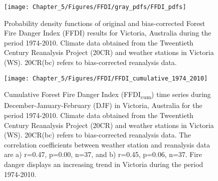 \begin{figure}[H]
\noindent \begin{centering}
\texttt{[image: Chapter\_5/Figures/FFDI/gray\_pdfs/FFDI\_pdfs]}
\par\end{centering}

\caption[Probability density functions of original and bias-corrected Forest
Fire Danger Index (FFDI) results for Victoria, Australia during the
period 1974-2010]{Probability density functions of original and bias-corrected Forest
Fire Danger Index (FFDI) results for Victoria, Australia during the
period 1974-2010. Climate data obtained from the Tweentieth Century
Reanalysis Project (20CR) and weather stations in Victoria (WS). 20CR(bc)
refers to bias-corrected reanalysis data. \label{fig:Probability density functions of orginal and bias-corrected Forest Fire Danger Index results for Victoria, Australia during the period 1974-2010}}
\end{figure}

\begin{figure}[H]
\noindent \begin{centering}
\texttt{[image: Chapter\_5/Figures/FFDI/FFDI\_cumulative\_1974\_2010]}
\par\end{centering}

\caption[Cumulative Forest Fire Danger Index (FFDI\protect\textsubscript{cum})
time series during December-January-February (DJF) in Victoria, Australia
for the period 1974-2010]{Cumulative Forest Fire Danger Index (FFDI\protect\textsubscript{cum})
time series during December-January-February (DJF) in Victoria, Australia
for the period 1974-2010. Climate data obtained from the Tweentieth
Century Reanalysis Project (20CR) and weather stations in Victoria
(WS). 20CR(bc) refers to bias-corrected reanalysis data. The correlation
coefficients between weather station and reanalysis data are a) r=0.47,
p=0.00, n=37, and b) r=0.45, p=0.06, n=37. Fire danger displays an
increasing trend in Victoria during the period 1974-2010. \label{fig: Cumulative Forest Fire Danger Index time series during December-January-February in Victoria, Australia for the period 1974-2010} }
\end{figure}



